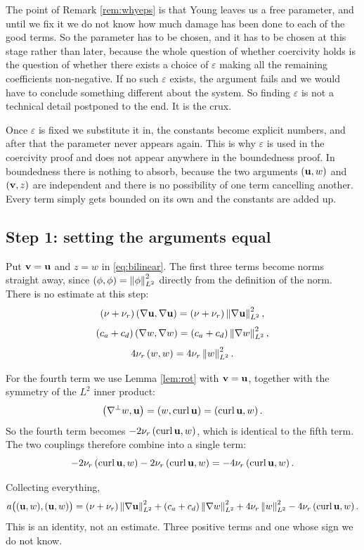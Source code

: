 \documentclass[11pt,a4paper]{article}
\begin{document}
The point of Remark \ref{rem:whyeps} is that Young leaves us a free parameter,
and until we fix it we do not know how much damage has been done to each of the
good terms. So the parameter has to be chosen, and it has to be chosen at this
stage rather than later, because the whole question of whether coercivity holds
is the question of whether there exists a choice of $\varepsilon$ making all the
remaining coefficients non-negative. If no such $\varepsilon$ exists, the
argument fails and we would have to conclude something different about the
system. So finding $\varepsilon$ is not a technical detail postponed to the end.
It is the crux.

Once $\varepsilon$ is fixed we substitute it in, the constants become explicit
numbers, and after that the parameter never appears again. This is why
$\varepsilon$ is used in the coercivity proof and does not appear anywhere in
the boundedness proof. In boundedness there is nothing to absorb, because the
two arguments $(\mathbf{u},w)$ and $(\mathbf{v},z)$ are independent and there is no
possibility of one term cancelling another. Every term simply gets bounded on
its own and the constants are added up.

\subsection{Step 1: setting the arguments equal}

Put $\mathbf{v} = \mathbf{u}$ and $z = w$ in \eqref{eq:bilinear}. The first three terms become
norms straight away, since $\left( \phi , \phi \right) = \left\lVert \phi \right\rVert_{L^{2}}^{2}$ directly from
the definition of the norm. There is no estimate at this step:
\[
  (\nu+\nu_{r})\left( \nabla \mathbf{u} , \nabla \mathbf{u} \right) = (\nu+\nu_{r})\left\lVert \nabla \mathbf{u} \right\rVert_{L^{2}}^{2} ,
\]
\[
  (c_{a}+c_{d})\left( \nabla w , \nabla w \right) = (c_{a}+c_{d})\left\lVert \nabla w \right\rVert_{L^{2}}^{2} ,
\]
\[
  4\nu_{r}\left( w , w \right) = 4\nu_{r}\left\lVert w \right\rVert_{L^{2}}^{2} .
\]

For the fourth term we use Lemma \ref{lem:rot} with $\mathbf{v} = \mathbf{u}$, together with
the symmetry of the $L^{2}$ inner product:
\[
  \left( \nabla^{\perp} w , \mathbf{u} \right) = \left( w , \operatorname{curl} \mathbf{u} \right) = \left( \operatorname{curl} \mathbf{u} , w \right) .
\]
So the fourth term becomes $-2\nu_{r}\left( \operatorname{curl} \mathbf{u} , w \right)$, which is identical to
the fifth term. The two couplings therefore combine into a single term:
\[
  - 2\nu_{r}\left( \operatorname{curl} \mathbf{u} , w \right) - 2\nu_{r}\left( \operatorname{curl} \mathbf{u} , w \right)
  = - 4\nu_{r}\left( \operatorname{curl} \mathbf{u} , w \right) .
\]

Collecting everything,
\begin{equation}\label{eq:identity}
  a\big( (\mathbf{u},w),(\mathbf{u},w) \big)
  = (\nu+\nu_{r})\left\lVert \nabla \mathbf{u} \right\rVert_{L^{2}}^{2}
  + (c_{a}+c_{d})\left\lVert \nabla w \right\rVert_{L^{2}}^{2}
  + 4\nu_{r}\left\lVert w \right\rVert_{L^{2}}^{2}
  - 4\nu_{r}\left( \operatorname{curl} \mathbf{u} , w \right) .
\end{equation}
This is an identity, not an estimate. Three positive terms and one whose sign we
do not know.
\end{document}
